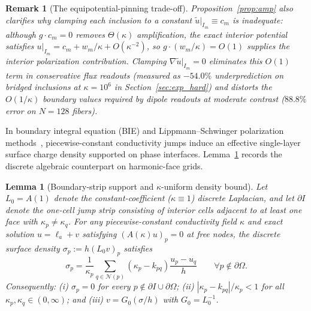 \documentclass[preprint,11pt]{elsarticle}
\newcommand{\abs}[1]{\left\lvert #1 \right\rvert}
\newtheorem{lemma}{Lemma}
\newtheorem{remark}{Remark}
\begin{document}
\begin{remark}[The equipotential-pinning trade-off]
Proposition~\ref{prop:amp} also clarifies why clamping each inclusion to a constant $\tilde u|_{I_m} \equiv c_m$ is inadequate: although $g \cdot c_m = 0$ removes $\Theta(\kappa)$ amplification, the exact interior potential satisfies $u|_{I_m} = c_m + w_m / \kappa + O(\kappa^{-2})$, so $g \cdot (w_m/\kappa) = O(1)$ supplies the interior polarization contribution. Clamping $\nabla \tilde u|_{I_m} = 0$ eliminates this $O(1)$ term in conservative flux readouts (measured as $-54.0\%$ underprediction on bridged inclusions at $\kappa=10^6$ in Section~\ref{sec:exp_hard}) and distorts the $O(1/\kappa)$ boundary values required by dipole readouts at moderate contrast ($88.8\%$ error on $N=128$ fibers).
\end{remark}

In boundary integral equation (BIE) and Lippmann--Schwinger polarization methods~\cite{greengard1994fast,cheng1998efficient,helsing2011integral,eyre1999fast,monchiet2012polarization}, piecewise-constant conductivity jumps induce an effective single-layer surface charge density supported on phase interfaces. Lemma~\ref{thm:strip} records the discrete algebraic counterpart on harmonic-face grids.

\begin{lemma}[Boundary-strip support and $\kappa$-uniform density bound]\label{thm:strip}
Let $L_0 = A(1)$ denote the constant-coefficient ($\kappa \equiv 1$) discrete Laplacian, and let $\partial I$ denote the one-cell jump strip consisting of interior cells adjacent to at least one face with $\kappa_p \neq \kappa_q$. For any piecewise-constant conductivity field $\kappa$ and exact solution $u = \ell_a + v$ satisfying $(A(\kappa)u)_p = 0$ at free nodes, the discrete surface density $\sigma_p := h (L_0 v)_p$ satisfies
\begin{equation}\label{eq:sigma_exact}
  \sigma_p = \frac{1}{\kappa_p} \sum_{q \in \mathcal{N}(p)} (\kappa_p - k_{pq}) \frac{u_p - u_q}{h} \qquad \forall p \notin \partial\Omega.
\end{equation}
Consequently: (i) $\sigma_p = 0$ for every $p \notin \partial I \cup \partial\Omega$; (ii) $\abs{\kappa_p - k_{pq}} / \kappa_p < 1$ for all $\kappa_p, \kappa_q \in (0, \infty)$; and (iii) $v = G_0(\sigma / h)$ with $G_0 = L_0^{-1}$.
\end{lemma}
\end{document}

